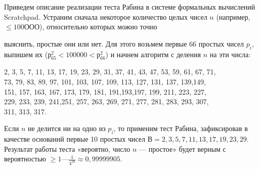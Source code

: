   	Приведем описание реализации теста Рабина в системе формальных 	вычислений Scratchpad. Устраним сначала некоторое количество целых чисел $n$ (например,$\leqslant 100 ООО$), относительно которых можно точно
  	
  	\pagebreak
  	\noindent
  	выяснить, простые они или нет. Для этого возьмем первые 66 простых  	чисел $p_i$, выпишем их ($р^{2}_{65}< 100 000 < р^{2}_{66}$) и начнем алгоритм с деления 	$n$ на эти числа:
  	\begin{center}
  		
  		2, 3, 5, 7, 11, 13, 17, 19, 23, 29, 31, 37, 41, 43, 47, 53, 59, 61, 67, 71, \\
  		73, 79, 83, 89, 97, 101, 103, 107, 109, 113, 127, 131, 137, 139,149, \\  		
  		151, 157, 163, 167, 173, 179, 181, 191,193,197, 199, 211, 223, 227, \\ 229, 233, 239, 241,251, 257, 263, 269, 271, 277, 281, 283, 293, 307, \\	311, 313, 317.
  	\end{center}	
  
  	Если $n$ не делится ни на одно из $p_i$, то применим тест Рабина, зафиксировав в качестве оснований первые 10 простых чисел $В = { 2, 3, 5, 7, 11, 13, 17, 19, 23, 29 }$. Результат работы теста «вероятно, число $n$ — простое» будет верным с вероятностью $ \geqslant 1 — \frac{1}{4^{10}} \approx	0,99999905.$
 
